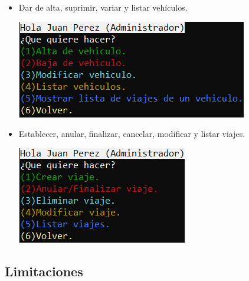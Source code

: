 \begin{itemize}
\begin{itemize}
\begin{center}
    \end{center}
    \item Dar de alta, suprimir, variar y listar vehículos.
    \begin{center}
      \includegraphics[]{FOTOS/menuAdminVehiculo.png}
    \end{center}
    \item Establecer, anular, finalizar, cancelar, modificar y listar viajes.
    \begin{center}
      \includegraphics[]{FOTOS/menuAdminViaje.png}
    \end{center}
  \end{itemize}
\end{itemize}

\newpage

\subsection{Limitaciones}

